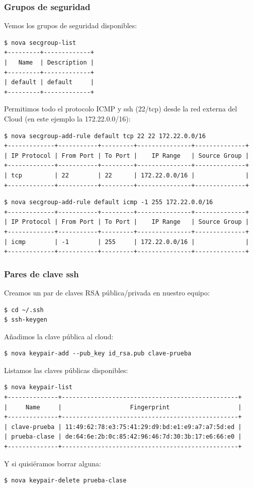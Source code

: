 \documentclass{beamer}
\begin{document}
\begin{frame}[fragile]
  \frametitle{Grupos de seguridad}
  Vemos los grupos de seguridad disponibles:
  \begin{lstlisting}[style=consola]
$ nova secgroup-list
+---------+-------------+
|   Name  | Description |
+---------+-------------+
| default | default     |
+---------+-------------+
  \end{lstlisting}
Permitimos todo el protocolo ICMP y ssh (22/tcp) desde la red externa del Cloud
(en este ejemplo la 172.22.0.0/16):
\begin{lstlisting}[style=consola]
$ nova secgroup-add-rule default tcp 22 22 172.22.0.0/16
+-------------+-----------+---------+---------------+--------------+
| IP Protocol | From Port | To Port |    IP Range   | Source Group |
+-------------+-----------+---------+---------------+--------------+
| tcp         | 22        | 22      | 172.22.0.0/16 |              |
+-------------+-----------+---------+---------------+--------------+
\end{lstlisting}
\begin{lstlisting}[style=consola]
$ nova secgroup-add-rule default icmp -1 255 172.22.0.0/16
+-------------+-----------+---------+---------------+--------------+
| IP Protocol | From Port | To Port |    IP Range   | Source Group |
+-------------+-----------+---------+---------------+--------------+
| icmp        | -1        | 255     | 172.22.0.0/16 |              |
+-------------+-----------+---------+---------------+--------------+
\end{lstlisting}
\end{frame}

\begin{frame}[fragile]
  \frametitle{Pares de clave ssh}
  Creamos un par de claves RSA pública/privada en nuestro equipo:
  \begin{lstlisting}[style=consola]
$ cd ~/.ssh
$ ssh-keygen
  \end{lstlisting}
  Añadimos la clave pública al cloud:
  \begin{lstlisting}[style=consola]
$ nova keypair-add --pub_key id_rsa.pub clave-prueba
  \end{lstlisting}
  Listamos las claves públicas disponibles:
    \begin{lstlisting}[style=consola]
$ nova keypair-list
+--------------+-------------------------------------------------+
|     Name     |                   Fingerprint                   |
+--------------+-------------------------------------------------+
| clave-prueba | 11:49:62:78:e3:75:41:29:d9:bd:e1:e9:a7:a7:5d:ed |
| prueba-clase | de:64:6e:2b:0c:85:42:96:46:7d:30:3b:17:e6:66:e0 |
+--------------+-------------------------------------------------+
    \end{lstlisting}
    Y si quisiéramos borrar alguna:
    \begin{lstlisting}[style=consola]
$ nova keypair-delete prueba-clase
    \end{lstlisting}
\end{frame}
\end{document}
